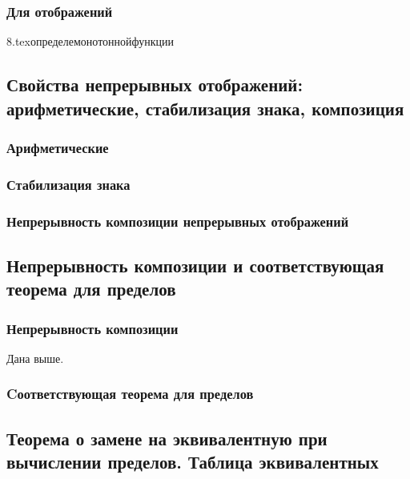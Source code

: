 \subsubsection{Для отображений}

{8.tex}{определемонотоннойфункции}

\subsection{Свойства непрерывных отображений: арифметические, стабилизация знака, композиция}
\subsubsection{Арифметические}
\subsubsection{Стабилизация знака}
\subsubsection{Непрерывность композиции непрерывных отображений}

\subsection{Непрерывность композиции и соответствующая теорема для пределов}
\subsubsection{Непрерывность композиции}
Дана выше.
\subsubsection{Cоответствующая теорема для пределов}

\subsection{\teormin Теорема о замене на эквивалентную при вычислении пределов. Таблица эквивалентных}
